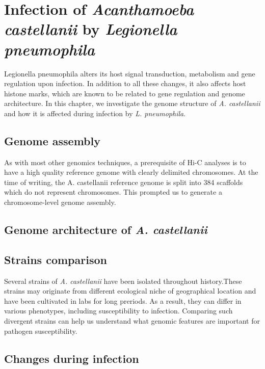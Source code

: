 
\chapter{Infection of \textit{Acanthamoeba castellanii} by \textit{Legionella pneumophila}} %

\label{ch:02-02} %


Legionella pneumophila alters its host signal transduction, metabolism and gene regulation upon infection. In addition to all these changes, it also affects host histone marks, which are known to be related to gene regulation and genome architecture. In this chapter, we investigate the genome structure of \textit{A. castellanii} and how it is affected during infection by \textit{L. pneumophila}.

\section{Genome assembly}

As with most other genomics techniques, a prerequisite of Hi-C analyses is to have a high quality reference genome with clearly delimited chromosomes. At the time of writing, the A. castellanii reference genome is split into 384 scaffolds which do not represent chromosomes. This prompted us to generate a chromosome-level genome assembly.

\section{Genome architecture of \textit{A. castellanii}}

\section{Strains comparison}

Several strains of \textit{A. castellanii} have been isolated throughout history.These strains may originate from different ecological niche of geographical location and have been cultivated in labs for long preriods. As a result, they can differ in various phenotypes, including susceptibility to infection. Comparing such divergent strains can help us understand what genomic features are important for pathogen susceptibility.


\section{Changes during infection}
